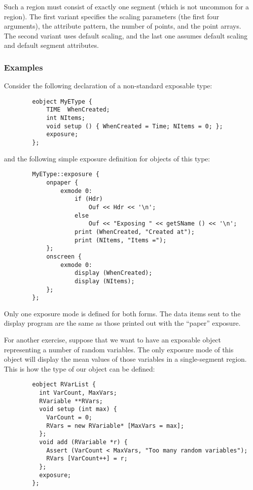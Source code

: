 Such a region must consist of exactly one segment (which is not uncommon for
a region).
The first variant specifies the scaling parameters (the first four arguments),
the attribute pattern, the number of points, and the point arrays.
The second variant uses default scaling, and the last one assumes default
scaling and default segment attributes.

\subsubsection*{Examples}

\noindent
Consider the following declaration of a non-standard exposable type:

\begin{verbatim}
        eobject MyEType {
            TIME  WhenCreated;
            int NItems;
            void setup () { WhenCreated = Time; NItems = 0; };
            exposure;
        };
\end{verbatim}

\noindent
and the following simple exposure definition for objects of this type:

\begin{verbatim}
        MyEType::exposure {
            onpaper {
                exmode 0:
                    if (Hdr)
                        Ouf << Hdr << '\n';
                    else
                        Ouf << "Exposing " << getSName () << '\n';
                    print (WhenCreated, "Created at");
                    print (NItems, "Items =");
            };
            onscreen {
                exmode 0:
                    display (WhenCreated);
                    display (NItems);
            };
        };
\end{verbatim}

Only one exposure mode is defined for both forms.
The data items sent to the display program are the same as those
printed out with the ``paper'' exposure.

For another exercise, suppose that we want to have an exposable
object representing a number of random variables.
The only exposure mode of this object will display the mean values of
those variables in a single-segment region.
This is how the type of our object can be defined:

\begin{verbatim}
        eobject RVarList {
          int VarCount, MaxVars;
          RVariable **RVars;
          void setup (int max) {
            VarCount = 0;
            RVars = new RVariable* [MaxVars = max];
          };
          void add (RVariable *r) {
            Assert (VarCount < MaxVars, "Too many random variables");
            RVars [VarCount++] = r;
          };
          exposure;
        };
\end{verbatim}

